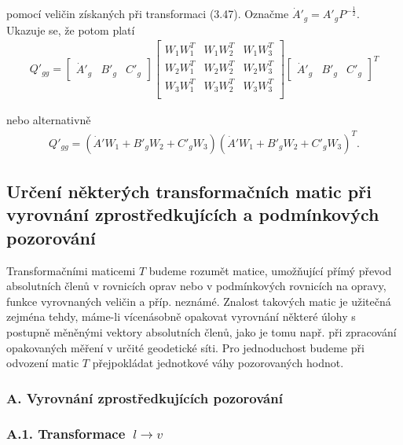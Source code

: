 \noindent
pomocí veličin získaných při transformaci (3.47).
%
Označme $\dot{A}'_g = A'_gP^{-\frac{1}{2}}$. Ukazuje se, že potom platí
%
\begin{align*}
  \tag{3.49}
  Q'_{gg} =
  \begin{bmatrix}
    \dot{A}'_g & B'_g &  C'_g
  \end{bmatrix}
  \begin{bmatrix}
    W^{}_1W^T_1 & W^{}_1W^T_2 & W^{}_1W^T_3 \\
    W^{}_2W^T_1 & W^{}_2W^T_2 & W^{}_2W^T_3 \\
    W^{}_3W^T_1 & W^{}_3W^T_2 & W^{}_3W^T_3 \\
  \end{bmatrix}
  \begin{bmatrix}
    \dot{A}'_g & B'_g &  C'_g
  \end{bmatrix}^T
\end{align*}


\noindent nebo alternativně 
%
\begin{align*}
  \tag{3.50} Q'_{gg} =
  (\dot{A}'W_1 + B'_{g}W_2 + C'_gW_3)
  (\dot{A}'W_1 + B'_{g}W_2 + C'_gW_3)^T.
\end{align*}



\subsection{Určení některých transformačních matic při vyrovnání
            zprostředkujících a podmínkových pozorování}

Transformačními maticemi $T$ budeme rozumět matice, umožňující
přímý převod absolutních členů v rovnicích oprav nebo
v podmínkových rovnicích na opravy, funkce vyrovnaných veličin a
příp. neznámé. Znalost takových matic je užitečná zejména tehdy,
máme-li vícenásobně opakovat vyrovnání některé úlohy s postupně
měněnými vektory absolutních členů, jako je tomu např. při
zpracování opakovaných měření v určité geodetické síti.
Pro jednoduchost budeme při odvození matic $T$ přejpokládat
jednotkové váhy pozorovaných hodnot.


\subsubsection*{A. Vyrovnání zprostředkujících pozorování}
\subsubsection*{A.1. Transformace $~l \rightarrow v$}

